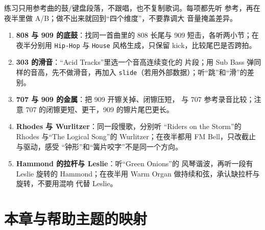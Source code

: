 \begin{exercise}
练习只用参考曲的鼓/键盘段落，不跟唱，也不复制歌词。每项都先听
参考，再在夜半里做 A/B；做不出来就回到“四个维度”，不要靠调大
音量掩盖差异。

\begin{enumerate}
  \item \textbf{808 与 909 的底鼓}：找同一首曲里的 808 长尾与 909
        短击，各听两小节；在夜半分别用 \texttt{Hip-Hop} 与
        \texttt{House} 风格生成，只保留 kick，比较尾巴是否跨拍。
  \item \textbf{303 的滑音}：“Acid Tracks”里选一个音高连续变化的
        片段；用 Sub Bass 弹同样的音高，先不做滑音，再加入
        \texttt{slide}（若用外部数据）；听“跳”和“滑”的差别。
  \item \textbf{707 与 909 的金属}：把 909 开镲关掉、闭镲压短，
        与 707 参考录音比较；注意 707 的闭镲更短、更干，909
        的镲片尾巴更长。
  \item \textbf{Rhodes 与 Wurlitzer}：同一段慢歌，分别听
        “Riders on the Storm”的 Rhodes 与“The Logical Song”的
        Wurlitzer；在夜半都用 FM Bell，只改截止与驱动，感受
        “钟形”和“簧片咬字”不是同一个方向。
  \item \textbf{Hammond 的拉杆与 Leslie}：听“Green Onions”的
        风琴谐波，再听一段有 Leslie 旋转的 Hammond；在夜半用
        Warm Organ 做持续和弦，承认缺拉杆与旋转，不要用混响
        代替 Leslie。
\end{enumerate}
\end{exercise}

\section{本章与帮助主题的映射}
\label{sec:iconic-help-map}

